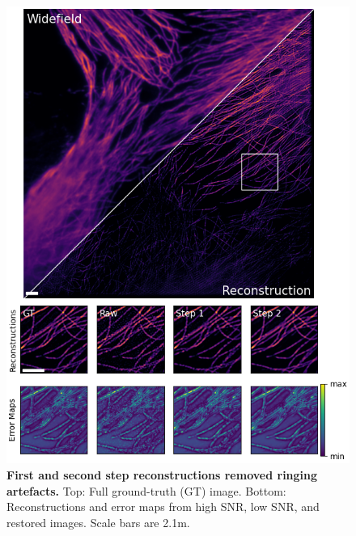 \documentclass[12pt]{article}
\begin{document}
\begin{figure}[hbtp]
    \includegraphics[scale=1.05, center]{figures/mt_1_008_error.png}
    \caption{\textbf{First and second step reconstructions removed ringing artefacts.}
    Top: Full ground-truth (GT) image. Bottom: Reconstructions and error maps from high SNR, low SNR, and restored images.
    Scale bars are 2.1\textmu m.}
    \label{fig:microtub_samples}
\end{figure}
\end{document}
